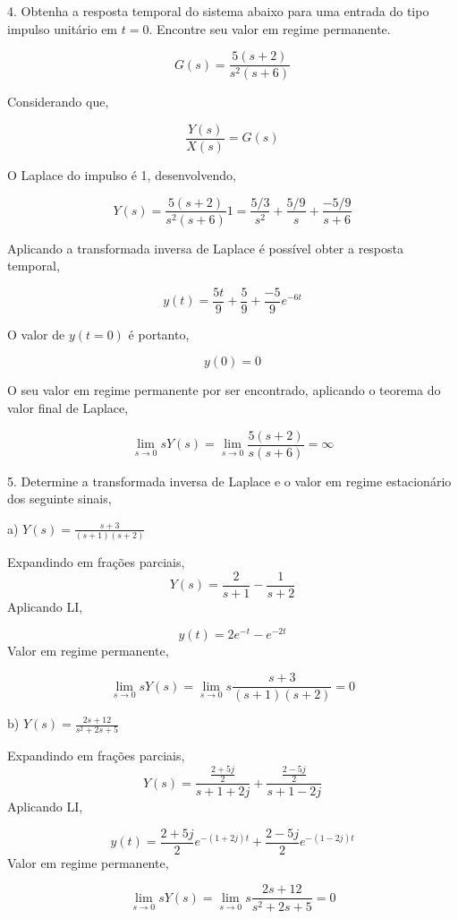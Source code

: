 \documentclass[paper=a4, fontsize=11pt]{article}
\begin{document}
\newpage

4. Obtenha a resposta temporal do sistema abaixo para uma entrada do tipo impulso unitário
em $t=0$. Encontre seu valor em regime permanente.

$$
G(s) = \frac{5(s+2)}{s^2(s+6)}
$$

Considerando que,

$$
\frac{Y(s)}{X(s)} = G(s)
$$

O Laplace do impulso é 1, desenvolvendo,

$$
Y(s) =  \frac{5(s+2)}{s^2(s+6)} 1 = \frac{5/3}{s^2} + \frac{5/9}{s} + \frac{-5/9}{s+6}
$$

Aplicando a transformada inversa de Laplace é possível obter a resposta temporal,

$$
y(t) = \frac{5 t}{9} + \frac{5}{9} + \frac{-5}{9} e^{-6 t}
$$

O valor de $y(t=0)$ é portanto,

$$
y(0) = 0
$$

O seu valor em regime permanente por ser encontrado, aplicando o teorema do valor final de Laplace,

$$
\lim_{s \to 0 }{s Y(s)} = \lim_{s \to 0}{\frac{5(s+2)}{s(s+6)}} = \infty
$$

\newpage

5. Determine a transformada inversa de Laplace e o valor em regime estacionário dos seguinte
sinais,

a) $Y(s) = \frac{s+3}{(s+1)(s+2)}$

Expandindo em frações parciais,
$$
Y(s) = \frac{2}{s+1} - \frac{1}{s+2}
$$
Aplicando LI,

$$
y(t) = 2 e^{-t} - e^{-2 t}
$$
Valor em regime permanente,

$$
\lim_{s \to 0 }{s Y(s)} = \lim_{s \to 0}{s \frac{s+3}{(s+1)(s+2)}} = 0 
$$

b) $Y(s) = \frac{2 s + 12}{s^2+2 s+5}$

Expandindo em frações parciais,
$$
Y(s) = \frac{ \frac{2+5j}{2} }{s+1+2j} + \frac{ \frac{2-5j}{2} }{s+1-2j}
$$
Aplicando LI,

$$
y(t) = \frac{2+5j}{2} e^{-(1+2j)t} +  \frac{2-5j}{2} e^{-(1-2j)t}
$$
Valor em regime permanente,

$$ 
\lim_{s \to 0 }{s Y(s)} = \lim_{s \to 0}{s \frac{2 s + 12}{s^2+2 s+5}} = 0  
$$
\end{document}
